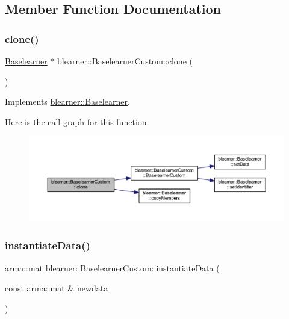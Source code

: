 \subsection{Member Function Documentation}
\mbox{\label{classblearner_1_1_baselearner_custom_a1442790658c7ad08832a94fbc60ff94a}} 
\subsubsection{\texorpdfstring{clone()}{clone()}}
{\footnotesize\ttfamily \mbox{\hyperlink{classblearner_1_1_baselearner}{Baselearner}} $\ast$ blearner\+::\+Baselearner\+Custom\+::clone (\begin{DoxyParamCaption}{ }\end{DoxyParamCaption})\hspace{0.3cm}{\ttfamily [virtual]}}



Implements \mbox{\hyperlink{classblearner_1_1_baselearner_a8e12c6739f085917a7d2da6570c51a21}{blearner\+::\+Baselearner}}.

Here is the call graph for this function\+:\nopagebreak
\begin{figure}[H]
\begin{center}
\leavevmode
\includegraphics[width=350pt]{classblearner_1_1_baselearner_custom_a1442790658c7ad08832a94fbc60ff94a_cgraph}
\end{center}
\end{figure}
\mbox{\label{classblearner_1_1_baselearner_custom_a83c25e681bb606ae4a36c249a36229b9}} 
\subsubsection{\texorpdfstring{instantiate\+Data()}{instantiateData()}}
{\footnotesize\ttfamily arma\+::mat blearner\+::\+Baselearner\+Custom\+::instantiate\+Data (\begin{DoxyParamCaption}\item[{const arma\+::mat \&}]{newdata }\end{DoxyParamCaption})\hspace{0.3cm}{\ttfamily [virtual]}}




